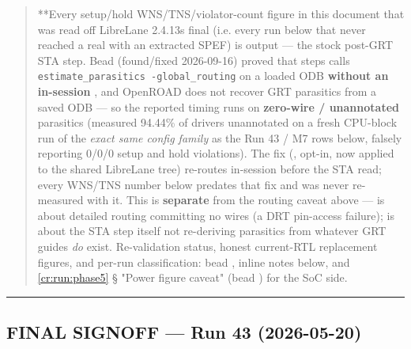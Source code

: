 \begin{record}
\begin{quote}
\warn{} **Every setup/\allowbreak{}hold
WNS/\allowbreak{}TNS/\allowbreak{}violator-count figure in this document
that was read off LibreLane 2.4.13\textquotesingle s final
 (i.e. every run below that never reached a real
 with an extracted SPEF) is
 output --- the stock post-GRT STA step. Bead
 (found/\allowbreak{}fixed 2026-09-16)
proved that step\textquotesingle s  calls
\texttt{estimate\_\allowbreak{}parasitics\ -\allowbreak{}global\_\allowbreak{}routing}
on a loaded ODB \textbf{without an in-session }, and
OpenROAD does not recover GRT parasitics from a saved ODB --- so the
reported timing runs on \textbf{zero-wire / unannotated} parasitics
(measured 94.44\% of drivers unannotated on a fresh CPU-block run of the
\emph{exact same config family} as the Run 43 / M7 rows below, falsely
reporting 0/0/0 setup and hold violations). The fix
(, opt-in, now applied to the shared
LibreLane tree) re-routes in-session before the STA read; every WNS/TNS
number below predates that fix and was never re-measured with it. This
is \textbf{separate} from the  routing caveat above ---
 is about detailed routing committing no wires (a DRT
pin-access failure);  is about the STA step itself not
re-deriving parasitics from whatever GRT guides \emph{do} exist.
Re-validation status, honest current-RTL replacement figures, and
per-run classification: bead , inline
notes below, and \cref{cr:run:phase5} § "Power figure
caveat" (bead ) for the SoC side.
\end{quote}

\begin{center}\rule{0.5\linewidth}{0.5pt}\end{center}

\end{record}

\subsection{\texorpdfstring{\ok{} FINAL SIGNOFF --- Run 43
(2026-05-20)}{ FINAL SIGNOFF --- Run 43 (2026-05-20)}}\label{cr:run:asap7:white-check-mark-final-signoff-run-43-2026-05-20}

